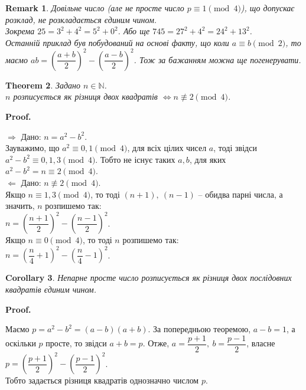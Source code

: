 \documentclass[a4paper, 10pt]{article}
\makeatletter
\theoremstyle{theoremdd}
\newtheorem{theorem}{Theorem}[subsection]
\theoremstyle{theoremdd}
\theoremstyle{theoremdd}
\theoremstyle{theoremdd}
\theoremstyle{theoremdd}
\theoremstyle{theoremdd}
\newtheorem{remark}[theorem]{Remark}
\theoremstyle{theoremdd}
\theoremstyle{theoremdd}
\newtheorem{corollary}[theorem]{Corollary}
\def\rightproof{$\boxed{\Rightarrow}$ }
\def\leftproof{$\boxed{\Leftarrow}$ }
\renewenvironment{proof}[1][Proof.\\]{\par
\pushQED{\hfill \qed}%
\normalfont \topsep6\p@\@plus6\p@\relax
\trivlist
\item\relax
{\bfseries
#1\@addpunct{.}}\hspace\labelsep\ignorespaces
}{%
\popQED\endtrivlist\@endpefalse
}
\makeatother
\begin{document}
\begin{remark}
Довільне число (але не просте число $p \equiv 1 \pmod 4$), що допускає розклад, не розкладається єдиним чином.\\
Зокрема $25 = 3^2 + 4^2 = 5^2 + 0^2$. Або ще $745 = 27^2 + 4^2 = 24^2 + 13^2$.\\
Останній приклад був побудований на основі факту, що коли $a \equiv b \pmod 2$, то маємо $ab = \left( \dfrac{a+b}{2} \right)^2 - \left( \dfrac{a-b}{2} \right)^2$. Тож за бажанням можна ще погенерувати.
\end{remark}

\begin{theorem}
Задано $n \in \mathbb{N}$.\\
$n$ розписується як різниця двох квадратів $\iff n \not\equiv 2 \pmod 4$.
\end{theorem}

\begin{proof}
\rightproof Дано: $n = a^2-b^2$.\\
Зауважимо, що $a^2 \equiv 0,1 \pmod 4$, для всіх цілих чисел $a$, тоді звідси $a^2-b^2 \equiv 0,1,3 \pmod 4$. Тобто не існує таких $a,b$, для яких $a^2-b^2 = n \equiv 2 \pmod 4$.
\bigskip \\
\leftproof Дано: $n \not\equiv 2 \pmod 4$.\\
Якщо $n \equiv 1,3 \pmod 4$, то тоді $(n+1),\ (n-1)$ -- обидва парні числа, а значить, $n$ розпишемо так:\\
$n = \left( \dfrac{n+1}{2} \right)^2 - \left( \dfrac{n-1}{2} \right)^2$.\\
Якщо $n \equiv 0 \pmod 4$, то тоді $n$ розпишемо так:\\
$n = \left( \dfrac{n}{4} + 1 \right)^2 - \left( \dfrac{n}{4} - 1 \right)^2$.
\end{proof}

\begin{corollary}
Непарне просте число розписується як різниця двох послідовних квадратів єдиним чином.
\end{corollary}

\begin{proof}
Маємо $p = a^2-b^2 = (a-b)(a+b)$. За попередньою теоремою, $a-b=1$, а оскільки $p$ просте, то звідси $a+b=p$. Отже, $a = \dfrac{p+1}{2},\ b = \dfrac{p-1}{2}$, власне\\
$p = \left( \dfrac{p+1}{2} \right)^2 - \left( \dfrac{p-1}{2} \right)^2$.\\
Тобто задається різниця квадратів однозначно числом $p$.
\end{proof}
\end{document}
